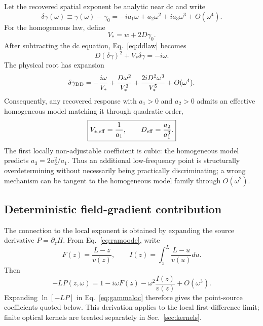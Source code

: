 \documentclass[aps,pra,twocolumn,superscriptaddress,nofootinbib]{revtex4-2}
\newcommand{\Deff}{D_{\mathrm{eff}}}
\begin{document}
Let the recovered spatial exponent be analytic near dc and write
\begin{equation}
\delta\gamma(\omega)
\equiv\gamma(\omega)-\gamma_0
=-ia_1\omega+a_2\omega^2+ia_3\omega^3+O(\omega^4).
\label{eq:gammaexpansion}
\end{equation}
For the homogeneous law, define
\begin{equation}
V_*=w+2D\gamma_0.
\end{equation}
After subtracting the dc equation, Eq.~\eqref{eq:ddlaw} becomes
\begin{equation}
D(\delta\gamma)^2+V_*\delta\gamma=-i\omega.
\end{equation}
The physical root has expansion
\begin{equation}
\delta\gamma_{\rm DD}
=-\frac{i\omega}{V_*}
+\frac{D\omega^2}{V_*^3}
+\frac{2iD^2\omega^3}{V_*^5}
+O(\omega^4).
\label{eq:ddexpansion}
\end{equation}
Consequently, any recovered response with $a_1>0$ and $a_2>0$ admits an effective homogeneous model matching it through quadratic order,
\begin{equation}
\boxed{
V_{*,\rm eff}=\frac{1}{a_1},
\qquad
\Deff=\frac{a_2}{a_1^3}.
}
\label{eq:effectiveD}
\end{equation}
The first locally non-adjustable coefficient is cubic: the homogeneous model predicts $a_3=2a_2^2/a_1$. Thus an additional low-frequency point is structurally overdetermining without necessarily being practically discriminating; a wrong mechanism can be tangent to the homogeneous model family through $O(\omega^2)$.

\subsection{Deterministic field-gradient contribution}

The connection to the local exponent is obtained by expanding the source derivative $P=\partial_zH$.  From Eq.~\eqref{eq:ramoode}, write
\begin{equation}
F(z)=\frac{L-z}{v(z)},
\qquad
I(z)=\int_z^L\frac{L-u}{v(u)}du.
\end{equation}
Then
\begin{equation}
-LP(z,\omega)
=1-i\omega F(z)-\omega^2\frac{I(z)}{v(z)}+O(\omega^3).
\end{equation}
Expanding $\ln[-LP]$ in Eq.~\eqref{eq:gammaloc} therefore gives the point-source coefficients quoted below.  This derivation applies to the local first-difference limit; finite optical kernels are treated separately in Sec.~\ref{sec:kernels}.
\end{document}
